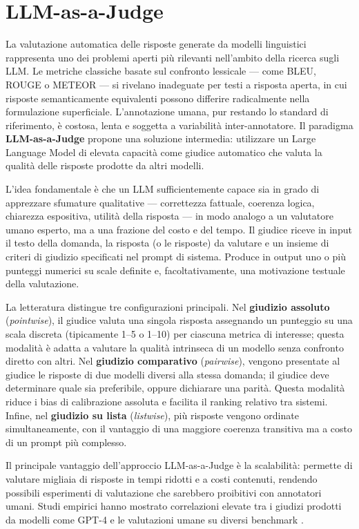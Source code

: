 \section{LLM-as-a-Judge}
\label{sec:llm_judge}

La valutazione automatica delle risposte generate da modelli linguistici
rappresenta uno dei problemi aperti più rilevanti nell'ambito della
ricerca sugli LLM. Le metriche classiche basate sul confronto lessicale
--- come BLEU, ROUGE o METEOR --- si rivelano inadeguate per testi a
risposta aperta, in cui risposte semanticamente equivalenti possono
differire radicalmente nella formulazione superficiale. L'annotazione
umana, pur restando lo standard di riferimento, è costosa, lenta e
soggetta a variabilità inter-annotatore. Il paradigma
\textbf{LLM-as-a-Judge} \cite{zheng2023judging} propone una soluzione
intermedia: utilizzare un Large Language Model di elevata capacità come
giudice automatico che valuta la qualità delle risposte prodotte da
altri modelli.

L'idea fondamentale è che un LLM sufficientemente capace sia in grado
di apprezzare sfumature qualitative --- correttezza fattuale,
coerenza logica, chiarezza espositiva, utilità della risposta ---
in modo analogo a un valutatore umano esperto, ma a una frazione
del costo e del tempo. Il giudice riceve in input il testo della
domanda, la risposta (o le risposte) da valutare e un insieme di
criteri di giudizio specificati nel prompt di sistema. Produce in
output uno o più punteggi numerici su scale definite e,
facoltativamente, una motivazione testuale della valutazione.

La letteratura distingue tre configurazioni principali. Nel
\textbf{giudizio assoluto} (\textit{pointwise}), il giudice valuta
una singola risposta assegnando un punteggio su una scala discreta
(tipicamente 1--5 o 1--10) per ciascuna metrica di interesse; questa
modalità è adatta a valutare la qualità intrinseca di un modello
senza confronto diretto con altri. Nel \textbf{giudizio comparativo}
(\textit{pairwise}), vengono presentate al giudice le risposte di
due modelli diversi alla stessa domanda; il giudice deve determinare
quale sia preferibile, oppure dichiarare una parità. Questa modalità
riduce i bias di calibrazione assoluta e facilita il ranking relativo
tra sistemi. Infine, nel \textbf{giudizio su lista} (\textit{listwise}),
più risposte vengono ordinate simultaneamente, con il vantaggio di una
maggiore coerenza transitiva ma a costo di un prompt più complesso.

Il principale vantaggio dell'approccio LLM-as-a-Judge è la scalabilità:
permette di valutare migliaia di risposte in tempi ridotti e a costi
contenuti, rendendo possibili esperimenti di valutazione che sarebbero
proibitivi con annotatori umani. Studi empirici hanno mostrato
correlazioni elevate tra i giudizi prodotti da modelli come GPT-4
e le valutazioni umane su diversi benchmark \cite{zheng2023judging}.

